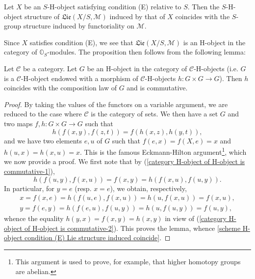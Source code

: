 \begin{proposition}\label{scheme H-object condition (E) Lie structure induced coincide}
Let $X$ be an $S$-H-object satisfying condition (E) relative to $S$. Then the $S$-H-object structure of $\mathfrak{Lie}(X/S,\mathscr{M})$ induced by that of $X$ coincides with the $S$-group structure induced by functoriality on $\mathscr{M}$.
\end{proposition}

Since $X$ satisfies condition (E), we see that $\mathfrak{Lie}(X/S,\mathscr{M})$ is an H-object in the category of $\mathbb{O}_S$-modules. The proposition then follows from the following lemma:

\begin{lemma}\label{category H-object of H-object is commutative}
Let $\mathcal{C}$ be a category. Let $G$ be an H-object in the category of $\mathcal{C}$-H-objects (i.e. $G$ is a $\mathcal{C}$-H-object endowed with a morphism of $\mathcal{C}$-H-objects $h:G\times G\to G$). Then $h$ coincides with the composition law of $G$ and is commutative.
\end{lemma}
\begin{proof}
By taking the values of the functors on a variable argument, we are reduced to the case where $\mathcal{C}$ is the category of sets. We then have a set $G$ and two maps $f,h:G\times G\to G$ such that
\begin{equation}\label{category H-object of H-object is commutative-1}
h(f(x,y),f(z,t))=f(h(x,z),h(y,t)),
\end{equation}
and we have two elements $e,u$ of $G$ such that $f(e,x)=f(X,e)=x$ and $h(u,x)=h(x,u)=x$. This is the famous Eckmann-Hilton argument\footnote{This argument is used to prove, for example, that higher homotopy groups are abelian.}, which we now provide a proof. We first note that by (\ref{category H-object of H-object is commutative-1}),
\begin{equation}\label{category H-object of H-object is commutative-2}
h(f(u,y),f(x,u))=f(x,y)=h(f(x,u),f(u,y)).
\end{equation}
In particular, for $y=e$ (resp. $x=e$), we obtain, respectively,
\begin{align*}
x=f(x,e)=h(f(u,e),f(x,u))=h(u,f(x,u))=f(x,u),\\
y=f(e,y)=h(f(e,u),f(u,y))=h(u,f(u,y))=f(u,y),
\end{align*}
whence the equality $h(y,x)=f(x,y)=h(x,y)$ in view of (\ref{category H-object of H-object is commutative-2}). This proves the lemma, whence \cref{scheme H-object condition (E) Lie structure induced coincide}.
\end{proof}

